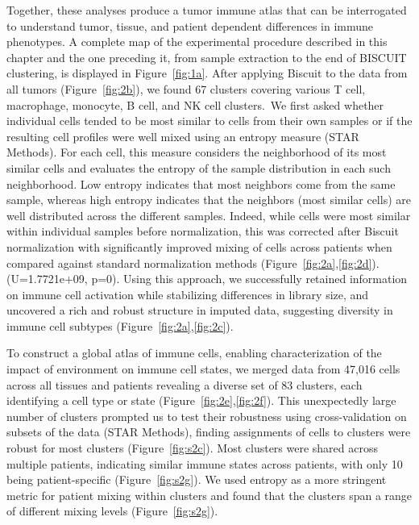 Together, these analyses produce a tumor immune atlas that can be interrogated to understand tumor, tissue, and patient dependent differences in immune phenotypes.
A complete map of the experimental procedure described in this chapter and the one preceding it, from sample extraction to the end of BISCUIT clustering, is displayed in Figure~\ref{fig:1a}.
After applying Biscuit to the data from all tumors (Figure~\ref{fig:2b}), we found 67 clusters covering various T cell, macrophage, monocyte, B cell, and NK cell clusters.~We first asked whether individual cells tended to be most similar to cells from their own samples or if the resulting cell profiles were well mixed using an entropy measure (STAR Methods).
For each cell, this measure considers the neighborhood of its most similar cells and evaluates the entropy of the sample distribution in each such neighborhood.
Low entropy indicates that most neighbors come from the same sample, whereas high entropy indicates that the neighbors (most similar cells) are well distributed across the different samples.
Indeed, while cells were most similar within individual samples before normalization, this was corrected after Biscuit normalization with significantly improved mixing of cells across patients when compared against standard normalization methods (Figure~\ref{fig:2a},\ref{fig:2d}).
(U=1.7721e+09, p=0).
Using this approach, we successfully retained information on immune cell activation while stabilizing differences in library size, and uncovered a rich and robust structure in imputed data, suggesting diversity in immune cell subtypes (Figure~\ref{fig:2a},\ref{fig:2c}).

To construct a global atlas of immune cells, enabling characterization of the impact of environment on immune cell states, we merged data from 47,016 cells across all tissues and patients revealing a diverse set of 83 clusters, each identifying a cell type or state (Figure~\ref{fig:2e},\ref{fig:2f}).
This unexpectedly large number of clusters prompted us to test their robustness using cross-validation on subsets of the data (STAR Methods), finding assignments of cells to clusters were robust for most clusters (Figure~\ref{fig:s2c}).
Most clusters were shared across multiple patients, indicating similar immune states across patients, with only 10 being patient-specific (Figure~\ref{fig:s2g}).
We used entropy as a more stringent metric for patient mixing within clusters and found that the clusters span a range of different mixing levels (Figure~\ref{fig:s2g}).

